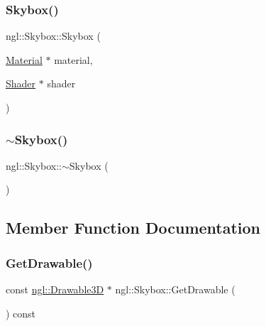\subsubsection{\texorpdfstring{Skybox()}{Skybox()}}
{\footnotesize\ttfamily ngl\+::\+Skybox\+::\+Skybox (\begin{DoxyParamCaption}\item[{\mbox{\hyperlink{classngl_1_1_material}{Material}} $\ast$}]{material,  }\item[{\mbox{\hyperlink{classngl_1_1_shader}{Shader}} $\ast$}]{shader }\end{DoxyParamCaption})\hspace{0.3cm}{\ttfamily [explicit]}}

\mbox{\label{classngl_1_1_skybox_a14cf215443e9991ce2701f302d484320}} 
\subsubsection{\texorpdfstring{$\sim$\+Skybox()}{~Skybox()}}
{\footnotesize\ttfamily ngl\+::\+Skybox\+::$\sim$\+Skybox (\begin{DoxyParamCaption}{ }\end{DoxyParamCaption})}



\subsection{Member Function Documentation}
\mbox{\label{classngl_1_1_skybox_a953afc0a4208d5a43e34976551cdbfc0}} 
\subsubsection{\texorpdfstring{Get\+Drawable()}{GetDrawable()}}
{\footnotesize\ttfamily const \mbox{\hyperlink{classngl_1_1_drawable3_d}{ngl\+::\+Drawable3D}} $\ast$ ngl\+::\+Skybox\+::\+Get\+Drawable (\begin{DoxyParamCaption}{ }\end{DoxyParamCaption}) const}

\mbox{\label{classngl_1_1_skybox_a40d8474c6d22e4b72f10ef7cdbac497f}} 
